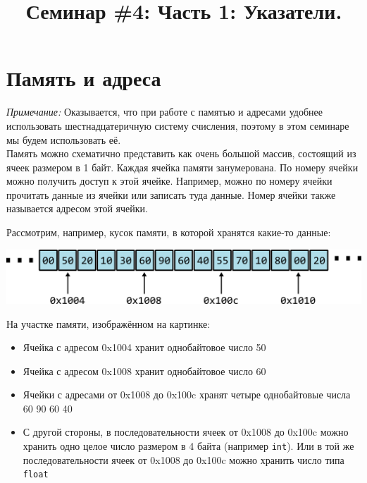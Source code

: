 \documentclass[10pt]{article}
\begin{document}
\title{Семинар \#4: Часть 1: Указатели. \vspace{-5ex}}\date{}\maketitle
\section*{Память и адреса}

\textit{Примечание:} Оказывается, что при работе с памятью и адресами удобнее использовать шестнадцатеричную систему счисления, поэтому в этом семинаре мы будем использовать её.\\

Память можно схематично представить как очень большой массив, состоящий из ячеек размером в 1 байт.
Каждая ячейка памяти занумерована. По номеру ячейки можно получить доступ к этой ячейке.
Например, можно по номеру ячейки прочитать данные из ячейки или записать туда данные.
Номер ячейки также называется адресом этой ячейки.

Рассмотрим, например, кусок памяти, в которой хранятся какие-то данные:

\begin{center}
\includegraphics[scale=1]{../images/memory1.png}
\end{center}

 
На участке памяти, изображённом на картинке:

\begin{itemize}
\item Ячейка с адресом 0x1004 хранит однобайтовое число 50
\item Ячейка с адресом 0x1008 хранит однобайтовое число 60
\item Ячейки с адресами от 0x1008 до 0x100c хранят четыре однобайтовые числа  60 90 60 40
\item С другой стороны, в последовательности ячеек от 0x1008 до 0x100c можно хранить одно целое число размером в 4 байта (например \texttt{int}). Или в той же последовательности ячеек от 0x1008 до 0x100c можно хранить число типа \texttt{float}
\end{itemize}
\end{document}
